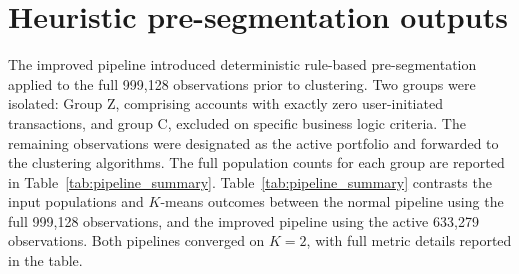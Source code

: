 \section{Heuristic pre-segmentation outputs}
\label{sec:results_presegmentation}

The improved pipeline introduced deterministic rule-based pre-segmentation applied to the full 999,128 observations prior to clustering.
Two groups were isolated: Group Z, comprising accounts with exactly zero user-initiated transactions, and group C, excluded on specific business logic criteria.
The remaining observations were designated as the active portfolio and forwarded to the clustering algorithms.
The full population counts for each group are reported in Table~\ref{tab:pipeline_summary}.
Table~\ref{tab:pipeline_summary} contrasts the input populations and $K$-means outcomes between the normal pipeline using the full 999,128 observations, and the improved pipeline using the active 633,279 observations.
Both pipelines converged on $K=2$, with full metric details reported in the table.
\begin{table}[H]
    \centering
    \caption{Comparison of data processing, segmentation eligibility, and $K$-means cluster label distribution between the normal pipeline (full 999,128 observations) and the improved pipeline (active 633,279 observations). Both configurations: 19 features post-filtration, min-max scaling, non-logarithmic, no PCA.}
    \label{tab:pipeline_summary}
\end{table}

